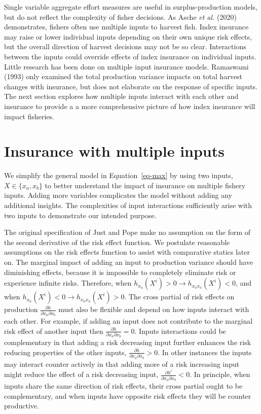 \documentclass[
  letterpaper,
  DIV=11,
  numbers=noendperiod]{scrartcl}
\theoremstyle{plain}
\theoremstyle{plain}
\theoremstyle{remark}
\begin{document}
Single variable aggregate effort measures are useful in
surplus-production models, but do not reflect the complexity of fisher
decisions. As Asche \emph{et al.} (2020) demonstrates, fishers often use
multiple inputs to harvest fish. Index insurance may raise or lower
individual inputs depending on their own unique risk effects, but the
overall direction of harvest decisions may not be so clear. Interactions
between the inputs could override effects of index insurance on
individual inputs. Little research has been done on multiple input
insurance models. Ramaswami (1993) only examined the total production
variance impacts on total harvest changes with insurance, but does not
elaborate on the response of specific inputs. The next section explores
how multiple inputs interact with each other and insurance to provide a
a more comprehensive picture of how index insurance will impact
fisheries.

\hypertarget{sec-multi}{%
\section{Insurance with multiple inputs}\label{sec-multi}}

We simplify the general model in Equation~\ref{eq-max} by using two
inputs, \(X\in\{{x_a,x_b}\}\) to better understand the impact of
insurance on multiple fishery inputs. Adding more variables complicates
the model without adding any additional insights. The complexities of
input interactions sufficiently arise with two inputs to demonstrate our
intended purpose.

The original specification of Just and Pope make no assumption on the
form of the second derivative of the risk effect function. We postulate
reasonable assumptions on the risk effects function to assist with
comparative statics later on. The marginal impact of adding an input to
production variance should have diminishing effects, because it is
impossible to completely eliminate risk or experience infinite risks.
Therefore, when \(h_{x_a}(X^i)>0 \rightarrow h_{x_ax_a}(X^i)<0\), and
when \(h_{x_a}(X^i)<0 \rightarrow h_{x_ax_a}(X^i)>0\). The cross partial
of risk effects on production
\(\frac{\partial h}{\partial x_a \partial x_b}\) must also be flexible
and depend on how inputs interact with each other. For example, if
adding an input does not contribute to the marginal risk effect of
another input then \(\frac{\partial h}{\partial x_a \partial x_b}=0\).
Inputs interactions could be complementary in that adding a risk
decreasing input further enhances the risk reducing properties of the
other inputs, \(\frac{\partial h}{\partial x_a \partial x_b}>0\). In
other instances the inputs may interact counter actively in that adding
more of a risk increasing input might reduce the effect of a risk
decreasing input, \(\frac{\partial h^i}{\partial x_a \partial x_b}<0\).
In principle, when inputs share the same direction of risk effects,
their cross partial ought to be complementary, and when inputs have
opposite risk effects they will be counter productive.
\end{document}
